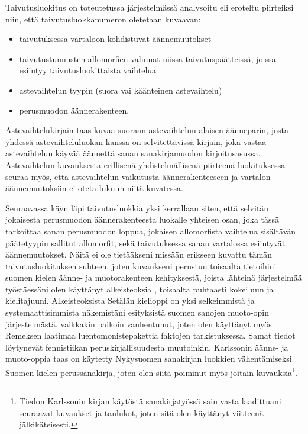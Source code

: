 \documentclass[free]{flammie}
\begin{document}
Taivutusluokitus on toteutetussa järjestelmässä analysoitu eli eroteltu piirteiksi
niin, että taivutusluokkanumeron oletetaan kuvaavan:

\begin{itemize}
\item taivutuksessa vartaloon kohdistuvat äännemuutokset
\item taivutustunnusten allomorfien valinnat niissä taivutuspäätteissä, joissa esiintyy taivutusluokittaista vaihtelua
\item astevaihtelun tyypin (suora vai käänteinen astevaihtelu)
\item perusmuodon äännerakenteen.
\end{itemize}

Astevaihtelukirjain taas kuvaa suoraan astevaihtelun alaisen äänneparin, josta yhdessä astevaihteluluokan kanssa on selvitettävissä kirjain, joka vastaa astevaihtelun käyvää äännettä sanan sanakirjamuodon kirjoitusasussa. Astevaihtelun kuvauksesta erillisenä yhdistelmällisenä piirteenä luokituksessa seuraa myös, että
astevaihtelun vaikutusta äännerakenteeseen ja vartalon äännemuutoksiin ei oteta
lukuun niitä kuvatessa.

Seuraavassa käyn läpi taivutusluokkia yksi kerrallaan siten, että selvitän
jokaisesta perusmuodon äännerakenteesta luokalle yhteisen osan, joka tässä
tarkoittaa sanan perusmuodon loppua, jokaisen allomorfista vaihtelua sisältävän
päätetyypin sallitut allomorfit, sekä taivutuksessa sanan vartalossa esiintyvät
äännemuutokset.  Näitä ei ole tietääkseni missään erikseen kuvattu tämän
taivutusluokituksen suhteen, joten kuvaukseni perustuu toisaalta tietoihini
suomen kielen äänne- ja muotorakenteen kehityksestä, joista lähteinä
järjestelmää työstäessäni olen käyttänyt alkeisteoksia
\cite{remes2004muoto,setala1930suomen,karlsson1982suomen}, toisaalta puhtaasti
kokeiluun ja kielitajuuni.  Alkeisteoksista Setälän kielioppi on yksi
selkeimmistä ja systemaattisimmista näkemistäni esityksistä suomen sanojen
muoto-opin järjestelmästä, vaikkakin paikoin vanhentunut, joten olen käyttänyt
myös Remeksen laatimaa luentomonistepakettia faktojen tarkistuksessa. Samat
tiedot löytynevät fennistiikan peruskirjallisuudesta muutoinkin. Karlssonin
äänne- ja muoto-oppia taas on käytetty Nykysuomen sanakirjan luokkien
vähentämiseksi Suomen kielen perussanakirja, joten olen siitä poiminut myös
joitain kuvauksia\footnote{Tiedon Karlssonin kirjan käytöstä sanakirjatyössä
sain vasta laadittuani seuraavat kuvaukset ja taulukot, joten sitä olen
käyttänyt viitteenä jälkikäteisesti.}.
\end{document}
